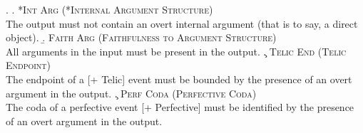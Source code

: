\ex. \label{medina_constraints} 
\a. \label{medina_constraints_intarg} \textsc{*Int Arg (*Internal Argument Structure)}\\ The output must not contain an overt internal argument (that is to say, a direct object).
\b. \label{medina_constraints_faith} \textsc{Faith Arg (Faithfulness to Argument Structure)}\\ All arguments in the input must be present in the output.
\c. \label{medina_constraints_telic} \textsc{Telic End (Telic Endpoint)}\\ The endpoint of a [+ Telic] event must be bounded by the presence of an overt argument in the output.
\c. \label{medina_constraints_perf} \textsc{Perf Coda (Perfective Coda)}\\ The coda of a perfective event [+ Perfective] must be identified by the presence of an overt argument in the output.

